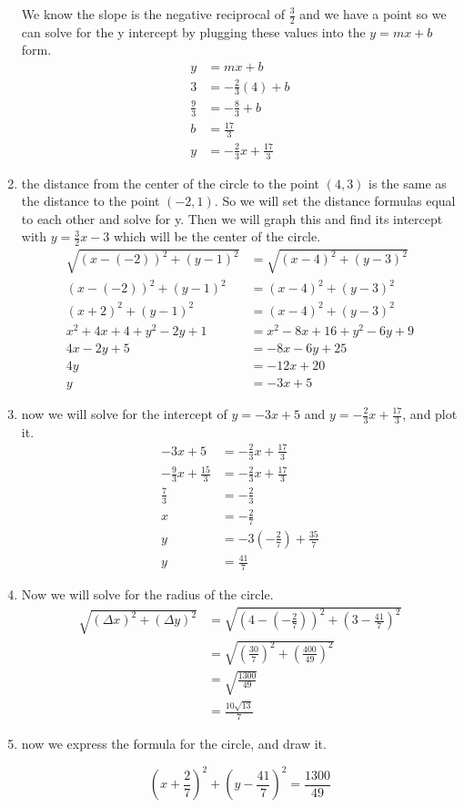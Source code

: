 \documentclass{article}
\begin{document}
\begin{enumerate}
        We know the slope is the negative reciprocal of $\frac{3}{2}$ and we have a point so we can solve for the y intercept by plugging these values into the $y=mx+b$ form.
        \begin{align*}
            y&=mx+b\\
            3&=-\frac{2}{3}(4)+b\\
            \frac{9}{3}&=-\frac{8}{3}+b\\
            b&=\frac{17}{3}\\
            y&=-\frac{2}{3}x+\frac{17}{3}
        \end{align*}
    \item the distance from the center of the circle to the point $(4,3)$ is the same as the distance to the point $(-2,1)$. So we will set the distance formulas equal to each other and solve for y. Then we will graph this and find its intercept with $y=\frac{3}{2}x-3$ which will be the center of the circle.
        \begin{align*}
            \sqrt{(x-(-2))^2+(y-1)^2}&=\sqrt{(x-4)^2+(y-3)^2}\\
            (x-(-2))^2+(y-1)^2&=(x-4)^2+(y-3)^2\\
            (x+2)^2+(y-1)^2&=(x-4)^2+(y-3)^2\\
            x^2+4x+4+y^2-2y+1&=x^2-8x+16+y^2-6y+9\\
            4x-2y+5&=-8x-6y+25\\
            4y&=-12x+20\\
            y&=-3x+5
        \end{align*}
    \item now we will solve for the intercept of $y=-3x+5$ and  $y=-\frac{2}{3}x+\frac{17}{3}$, and plot it.
        \begin{align*}
            -3x+5&=-\frac{2}{3}x+\frac{17}{3}\\
            -\frac{9}{3}x+\frac{15}{3}&=-\frac{2}{3}x+\frac{17}{3}\\
            \frac{7}{3}&=-\frac{2}{3}\\
            x&=-\frac{2}{7}\\
            y&=-3\left(-\frac{2}{7}\right)+\frac{35}{7}\\
            y&=\frac{41}{7}
        \end{align*}
    \item Now we will solve for the radius of the circle.
        \begin{align*}
            \sqrt{(\Delta x)^2+(\Delta y)^2}&=\sqrt{\left(4-\left(-\frac{2}{7}\right)\right)^2+\left(3-\frac{41}{7}\right)^2}\\
            &=\sqrt{\left(\frac{30}{7}\right)^2+\left(\frac{400}{49}\right)^2}\\
            &=\sqrt{\frac{1300}{49}}\\
            &=\frac{10\sqrt{13}}{7}
        \end{align*}
    \item now we express the formula for the circle, and draw it.

    \[\left(x+\frac{2}{7}\right)^2+\left(y-\frac{41}{7}\right)^2=\frac{1300}{49}\]
\end{enumerate}
\end{document}
